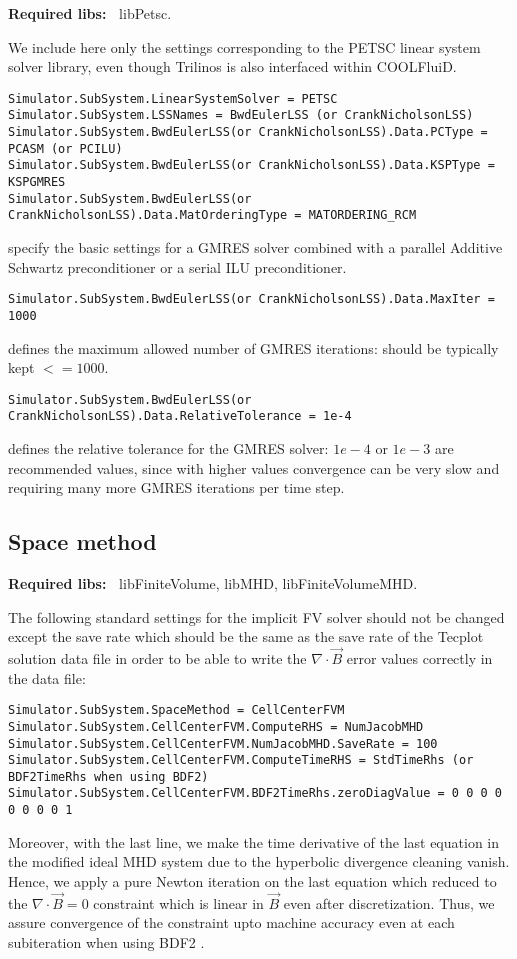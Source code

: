 \documentclass[11pt]{article}
\begin{document}
{\bf Required libs:~} libPetsc.

We include here only the settings corresponding to the PETSC linear system solver library,
even though Trilinos is also interfaced within COOLFluiD.

\begin{lstlisting}[breaklines]
Simulator.SubSystem.LinearSystemSolver = PETSC
Simulator.SubSystem.LSSNames = BwdEulerLSS (or CrankNicholsonLSS)
Simulator.SubSystem.BwdEulerLSS(or CrankNicholsonLSS).Data.PCType = PCASM (or PCILU)
Simulator.SubSystem.BwdEulerLSS(or CrankNicholsonLSS).Data.KSPType = KSPGMRES
Simulator.SubSystem.BwdEulerLSS(or CrankNicholsonLSS).Data.MatOrderingType = MATORDERING_RCM
\end{lstlisting}
specify the basic settings for a GMRES solver combined with a parallel Additive Schwartz preconditioner or a serial ILU preconditioner.

\begin{lstlisting}[breaklines]
Simulator.SubSystem.BwdEulerLSS(or CrankNicholsonLSS).Data.MaxIter = 1000
\end{lstlisting}
defines the maximum allowed number of GMRES iterations: should be typically kept $<= 1000$.

\begin{lstlisting}[breaklines]
Simulator.SubSystem.BwdEulerLSS(or CrankNicholsonLSS).Data.RelativeTolerance = 1e-4
\end{lstlisting}
defines the relative tolerance for the GMRES solver: $1e-4$ or $1e-3$ are recommended values, since with higher values 
convergence can be very slow and requiring many more GMRES iterations per time step.

\subsection{Space method}

{\bf Required libs:~} libFiniteVolume, libMHD, libFiniteVolumeMHD.

The following standard settings for the implicit FV solver should not be changed except the save rate which should be the same as the save rate of the Tecplot solution data file in order to be able to write the $\nabla\cdot\vec{B}$ error values correctly in the data file:

\begin{lstlisting}[breaklines]
Simulator.SubSystem.SpaceMethod = CellCenterFVM
Simulator.SubSystem.CellCenterFVM.ComputeRHS = NumJacobMHD
Simulator.SubSystem.CellCenterFVM.NumJacobMHD.SaveRate = 100
Simulator.SubSystem.CellCenterFVM.ComputeTimeRHS = StdTimeRhs (or BDF2TimeRhs when using BDF2)
Simulator.SubSystem.CellCenterFVM.BDF2TimeRhs.zeroDiagValue = 0 0 0 0 0 0 0 0 1
\end{lstlisting}
Moreover, with the last line, we make the time derivative of the last equation in the modified ideal MHD system due to the hyperbolic divergence cleaning vanish. Hence, we apply a pure Newton iteration on the last equation which reduced to the $\nabla\cdot\vec{B}=0$ constraint which is linear in $\vec{B}$ even after discretization. Thus, we assure convergence of the constraint upto machine accuracy even at each subiteration when using BDF2 \cite{yalim11jcp}.
\end{document}
